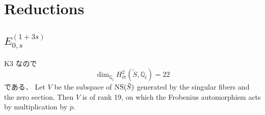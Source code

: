 \documentclass[main]{subfiles}
\begin{document}
\chapter{Reductions}
\section{$E_{0,s}^{(1 + 3s)}$}

K3 なので
\begin{equation}
    \dim_{\mathbb{Q}_{l}} H_{\text{\'et}}^{2}(\tilde{S}, \mathbb{Q}_{l}) = 22
\end{equation}
である．
Let $V$ be the subspace of $\operatorname{NS}(\tilde{S})$ generated by the singular fibers and the zero section.
Then $V$ is of rank 19, on which the Frobenius automorphism acts by multiplication by $p$.
\end{document}
